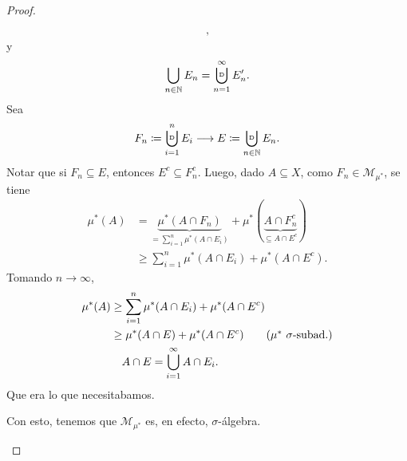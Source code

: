\begin{proof}
\begin{enumerate}
\begin{itemize}
\begin{align*}
			,\end{align*}
			y 
			\[ \displaystyle\bigcup_{n\in\N} E_n = \displaystyle\bigcupd_{n=1}^{\infty} E_{n}'. \]
			Sea 
			\[ F_n \coloneq \displaystyle\bigcupd_{i=1}^{n} E_i \longrightarrow E \coloneq \displaystyle\bigcupd_{n\in\N} E_n. \]
			Notar que si $F_n \subseteq E$, entonces $E^c \subseteq F_{n}^{c}$. Luego, dado $A \subseteq X$, como $F_n \in \mathscr{M}_{\mu^{*}}$, se tiene
			\begin{align*}
				\mu^{*}(A) &= \underbrace{\mu^{*}(A \cap F_n)}_{= \sum_{i=1}^{n} \mu^{*}(A \cap E_i)} + \mu^{*}(\underbrace{A \cap F_{n}^{c}}_{\subseteq A \cap E^c}) \\
				& \geq \sum_{i=1}^{n} \mu^{*}(A \cap E_i) + \mu^{*}(A \cap E^c)
			.\end{align*}
			Tomando $n \to \infty$,
			\begin{align*}
				\mu^{*}(A) & \geq \sum_{i=1}^{n} \mu^{*}(A \cap E_i) + \mu^{*}(A \cap E^c) \\
				& \geq \mu^{*}(A \cap E) + \mu^{*}(A \cap E^c) \tag{$\mu^{*}\ \sigma$-subad.} \\
				& \quad A \cap E = \bigcup_{i=1}^{\infty} A \cap E_i
			.\end{align*}
			Que era lo que necesitabamos. \checkmark{}
		\end{itemize}
		Con esto, tenemos que $\mathscr{M}_{\mu^{*}}$ es, en efecto, $\sigma$-álgebra.
	\end{enumerate}
\end{proof}

